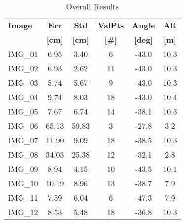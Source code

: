 \begin{table}
\caption{Overall Results}
\begin{tabular*}{\columnwidth}{@{\extracolsep{\fill}} l ccccc}
\toprule
\textbf{Image} & \textbf{Err} & \textbf{Std} & \textbf{ValPts} &  \textbf{Angle} & \textbf{Alt} \\
& \textbf{[cm]} & \textbf{[cm]} & \textbf{[\#]} &  \textbf{[deg]} & \textbf{[m]} \\ [0.5ex]
\midrule
IMG\_01 & 6.95 & 3.40 & 6  & -43.0 & 10.3 \\
IMG\_02 & 6.93 & 2.62 & 11 & -43.0 & 10.3 \\
IMG\_03 & 5.74 & 5.67 & 9  & -43.0 & 10.3 \\
IMG\_04 & 9.74 & 8.03 & 18 & -43.0 & 10.4 \\
IMG\_05 & 7.67 & 6.74 & 14 & -38.1 & 10.3 \\
IMG\_06 & 65.13 & 59.83 & 3  & -27.8 & 3.2 \\
IMG\_07 & 11.90 & 9.09 & 18 & -38.5 & 10.3 \\
IMG\_08 & 34.03 & 25.38 & 12 & -32.1 & 2.8 \\
IMG\_09 & 8.94 & 4.15 & 10 & -43.5 & 10.1 \\
IMG\_10 & 10.19 & 8.96 & 13 & -38.7 & 7.9 \\
IMG\_11 & 7.59 & 6.04 & 6  & -47.3 & 7.9 \\
IMG\_12 & 8.53 & 5.48 & 18 & -36.8 & 10.3 \\
\bottomrule
\end{tabular*}
\label{tab:results_overall}
\end{table}
